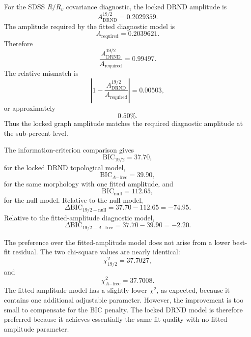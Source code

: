 \documentclass[12pt]{iopart}
\begin{document}
For the SDSS \(R/R_v\) covariance diagnostic, the locked DRND amplitude is
\begin{equation}
A_{\mathrm{DRND}}^{19/2}
=
0.2029359.
\label{eq:adrnd_value}
\end{equation}
The amplitude required by the fitted diagnostic model is
\begin{equation}
A_{\mathrm{required}}
=
0.2039621.
\label{eq:arequired_value}
\end{equation}
Therefore
\begin{equation}
\frac{
A_{\mathrm{DRND}}^{19/2}
}{
A_{\mathrm{required}}
}
=
0.99497.
\label{eq:adrnd_required_ratio}
\end{equation}
The relative mismatch is
\begin{equation}
\left|
1-
\frac{
A_{\mathrm{DRND}}^{19/2}
}{
A_{\mathrm{required}}
}
\right|
=
0.00503,
\end{equation}
or approximately
\begin{equation}
0.50\%.
\end{equation}
Thus the locked graph amplitude matches the required diagnostic amplitude at the sub-percent level.

The information-criterion comparison gives
\begin{equation}
\mathrm{BIC}_{19/2}=37.70,
\end{equation}
for the locked DRND topological model,
\begin{equation}
\mathrm{BIC}_{A\mathrm{-free}}=39.90,
\end{equation}
for the same morphology with one fitted amplitude, and
\begin{equation}
\mathrm{BIC}_{\mathrm{null}}=112.65,
\end{equation}
for the null model. Relative to the null model,
\begin{equation}
\Delta\mathrm{BIC}_{19/2-\mathrm{null}}
=
37.70-112.65
=
-74.95.
\end{equation}
Relative to the fitted-amplitude diagnostic model,
\begin{equation}
\Delta\mathrm{BIC}_{19/2-A\mathrm{-free}}
=
37.70-39.90
=
-2.20.
\end{equation}

The preference over the fitted-amplitude model does not arise from a lower best-fit residual. The two chi-square values are nearly identical:
\begin{equation}
\chi^2_{19/2}=37.7027,
\end{equation}
and
\begin{equation}
\chi^2_{A\mathrm{-free}}=37.7008.
\end{equation}
The fitted-amplitude model has a slightly lower \(\chi^2\), as expected, because it contains one additional adjustable parameter. However, the improvement is too small to compensate for the BIC penalty. The locked DRND model is therefore preferred because it achieves essentially the same fit quality with no fitted amplitude parameter.
\end{document}
